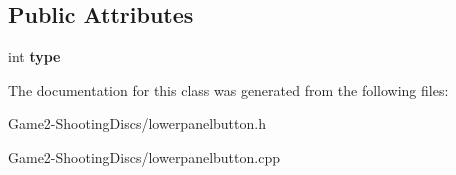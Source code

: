 \subsection*{Public Attributes}
\begin{DoxyCompactItemize}
\item 
\mbox{\label{classLowerPanelButton_ad929b350b6b2629bf2d05eb9eea64c41}} 
int {\bfseries type}
\end{DoxyCompactItemize}


The documentation for this class was generated from the following files\+:\begin{DoxyCompactItemize}
\item 
Game2-\/\+Shooting\+Discs/lowerpanelbutton.\+h\item 
Game2-\/\+Shooting\+Discs/lowerpanelbutton.\+cpp\end{DoxyCompactItemize}
